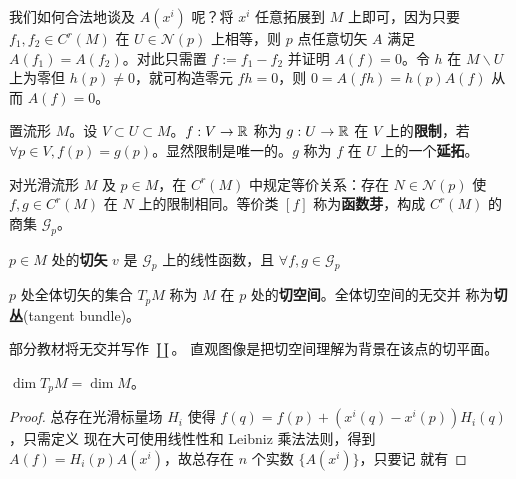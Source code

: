 我们如何合法地谈及 $A(x^i)$ 呢？将 $x^i$ 任意拓展到 $M$ 上即可，因为只要 $f_1,f_2\in C^r(M)$ 在 $U\in\mathscr N(p)$ 上相等，则 $p$ 点任意切矢 $A$ 满足 $A(f_1)=A(f_2)$。对此只需置 $f:=f_1-f_2$ 并证明 $A(f)=0$。令 $h$ 在 $M\backslash U$ 上为零但 $h(p)\ne 0$，就可构造零元 $fh=0$，则 $0=A(fh)=h(p)A(f)$ 从而 $A(f)=0$。

\begin{definition}
    置流形 $M$。设 $V\subset U\subset M$。$f:V\to\mathbb{R}$ 称为 $g:U\to\mathbb{R}$ 在 $V$ 上的\textbf{限制}，若 $\forall p\in V,f(p)=g(p)$。显然限制是唯一的。$g$ 称为 $f$ 在 $U$ 上的一个\textbf{延拓}。

    
\end{definition}

对光滑流形 $M$ 及 $p\in M$，在 $C^r(M)$ 中规定等价关系：存在 $N\in\mathscr N(p)$ 使 $f,g\in C^r(M)$ 在 $N$ 上的限制相同。等价类 $[f]$ 称为\textbf{函数芽}，构成 $C^r(M)$ 的商集 $\mathscr G_p$。
\begin{definition}
    $p\in M$ 处的\textbf{切矢} $v$ 是 $\mathscr G_p$ 上的线性函数，且 $\forall f,g\in\mathscr G_p$

    $p$ 处全体切矢的集合 $T_p M$ 称为 $M$ 在 $p$ 处的\textbf{切空间}。全体切空间的无交并
    称为\textbf{切丛}(tangent bundle)。
\end{definition}

\begin{remark}
    部分教材将无交并写作 $\coprod$。
    直观图像是把切空间理解为背景在该点的切平面。
\end{remark}


\begin{theorem}
    $\dim T_p M=\dim M$。
\end{theorem}

\begin{proof}
    总存在光滑标量场 $H_i$ 使得 $f(q) =f(p)+(x^i(q)-x^i(p))H_i(q)$，只需定义
现在大可使用线性性和 Leibniz 乘法法则，得到 $A(f)=H_i(p) A(x^i)$，故总存在 $n$ 个实数 $\{A(x^i)\}$，只要记
就有
\end{proof}

